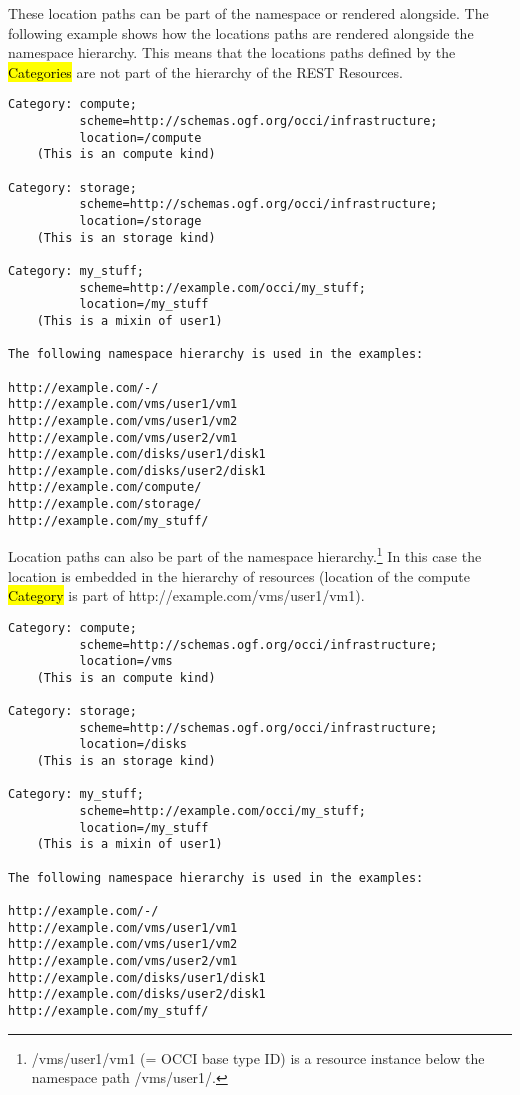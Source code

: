 \documentclass[10pt,a4paper]{article}
\begin{document}
These location paths can be part of the namespace or rendered
alongside. The following example shows how the locations paths are
rendered alongside the namespace hierarchy. This means that the
locations paths defined by the \hl{Categories} are not part of the
hierarchy of the REST Resources.

\begin{verbatim}
Category: compute;
          scheme=http://schemas.ogf.org/occi/infrastructure;
          location=/compute 
    (This is an compute kind)

Category: storage;
          scheme=http://schemas.ogf.org/occi/infrastructure;
          location=/storage 
    (This is an storage kind)

Category: my_stuff;
          scheme=http://example.com/occi/my_stuff;
          location=/my_stuff 
    (This is a mixin of user1)

The following namespace hierarchy is used in the examples:

http://example.com/-/
http://example.com/vms/user1/vm1
http://example.com/vms/user1/vm2
http://example.com/vms/user2/vm1
http://example.com/disks/user1/disk1
http://example.com/disks/user2/disk1
http://example.com/compute/
http://example.com/storage/
http://example.com/my_stuff/
\end{verbatim}

Location paths can also be part of the namespace
hierarchy.\footnote{/vms/user1/vm1 (= OCCI base type ID) is a resource
  instance below the namespace path /vms/user1/.} In this case the
location is embedded in the hierarchy of resources (location of the
compute \hl{Category} is part of http://example.com/vms/user1/vm1).

\begin{verbatim}
Category: compute;
          scheme=http://schemas.ogf.org/occi/infrastructure;
          location=/vms 
    (This is an compute kind)

Category: storage;
          scheme=http://schemas.ogf.org/occi/infrastructure;
          location=/disks 
    (This is an storage kind)

Category: my_stuff;
          scheme=http://example.com/occi/my_stuff;
          location=/my_stuff 
    (This is a mixin of user1)

The following namespace hierarchy is used in the examples:

http://example.com/-/
http://example.com/vms/user1/vm1
http://example.com/vms/user1/vm2
http://example.com/vms/user2/vm1
http://example.com/disks/user1/disk1
http://example.com/disks/user2/disk1
http://example.com/my_stuff/
\end{verbatim}
\end{document}
